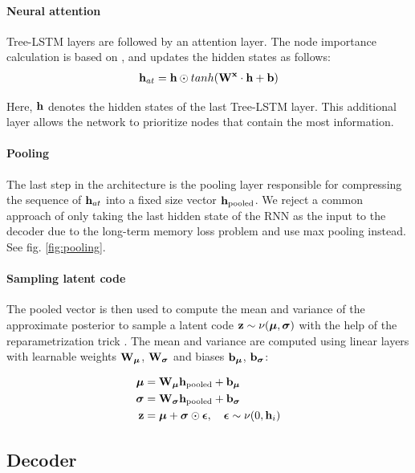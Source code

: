 \paragraph{Neural attention} Tree-LSTM layers are followed by an attention layer. 
The node importance calculation is based on \cite{winata2018attention}, and updates the hidden states as follows:
\begin{align}
    \mathbf{h}_{at} = \mathbf{h} \odot tanh(\mathbf{W}^{\mathbf{x}} \cdot \mathbf{h} + \mathbf{b})
\end{align}

Here, $\mathbf{h}$ denotes the hidden states of the last Tree-LSTM layer. This additional layer allows the network to prioritize nodes that contain the most information. 


\paragraph{Pooling} 
The last step in the architecture is the pooling layer responsible for compressing the sequence of $\mathbf{h}_{at}$ into a fixed size vector $\mathbf{h}_\text{pooled}$. 
We reject a common \cite{fabius2015variational} approach of only taking the last hidden state of the RNN as the input to the decoder due to the long-term memory loss problem \cite{kao2020comparison} and use max pooling instead.
See fig. \ref{fig:pooling}.

\paragraph{Sampling latent code} The pooled vector is then used to compute the mean and variance of the approximate posterior to sample a latent code $\mathbf{z} \sim \nu(\boldsymbol\mu, \boldsymbol\sigma)$ with the help of the reparametrization trick \cite{kingma2013auto}. The mean and variance are computed using linear layers with learnable weights $\mathbf{W}_{\boldsymbol\mu}$, $\mathbf{W}_{\boldsymbol\sigma}$ and biases $\mathbf{b}_{\boldsymbol\mu}$, $\mathbf{b}_{\boldsymbol\sigma}$:

\begin{align}
\boldsymbol\mu& = \mathbf{W}_{\boldsymbol\mu} \mathbf{h}_\text{pooled} + \mathbf{b}_{\boldsymbol\mu} \\
\boldsymbol\sigma& = \mathbf{W}_{\boldsymbol\sigma} \mathbf{h}_\text{pooled} + \mathbf{b}_{\boldsymbol\sigma} \\
\mathbf{z} & = \boldsymbol\mu+ \boldsymbol\sigma\odot \boldsymbol{\epsilon}, \quad \boldsymbol{\epsilon} \sim \nu(0, \mathbf{h}_i)
\end{align}
\newpage
\subsection{Decoder}
\label{sec:decoder}

